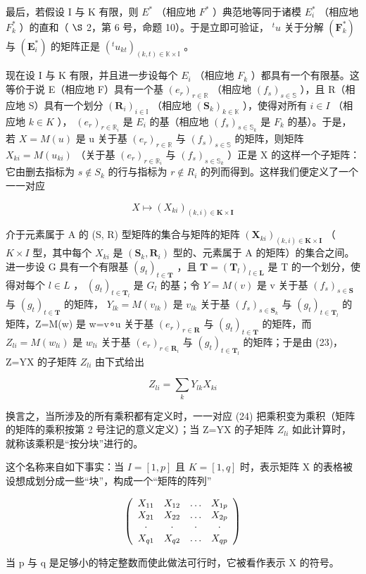 最后，若假设 I 与 K 有限，则 \(E^{*}\) （相应地 \(F^{*}\) ）典范地等同于诸模 \(E_{i}^{*}\) （相应地 \(F_{k}^{*}\) ）的直和（ \(\S\) 2，第 6 号，命题 10）。于是立即可验证， \(^{t}u\) 关于分解 \((\mathbf{F}_{k}^{*})\) 与 \((\mathbf{E}_{i}^{*})\) 的矩阵正是 \((^{t}u_{kt})_{(k,t)\in\mathbb{K}\times\mathbb{I}}\) 。

现在设 I 与 K 有限，并且进一步设每个 \(E_{i}\) （相应地 \(F_{k}\) ）都具有一个有限基。这等价于说 E（相应地 F）具有一个基 \((e_{r})_{r\in\mathbb{R}}\) （相应地 \((f_{s})_{s\in\mathbb{S}}\) ），且 R（相应地 S）具有一个划分 \((\mathbf{R}_{i})_{i\in\mathbb{I}}\) （相应地 \((\mathbf{S}_{k})_{k\in\mathbb{K}}\) ），使得对所有 \(i\in I\) （相应地 \(k\in K\) ）， \((e_{r})_{r\in\mathbb{R}_{i}}\) 是 \(E_{i}\) 的基（相应地 \((f_{s})_{s\in\mathbb{S}_{k}}\) 是 \(F_{k}\) 的基）。于是，若 \(X=M(u)\) 是 u 关于基 \((e_{r})_{r\in\mathbb{R}}\) 与 \((f_{s})_{s\in\mathbb{S}}\) 的矩阵，则矩阵 \(X_{ki}=M(u_{ki})\) （关于基 \((e_{r})_{r\in\mathbb{R}_{i}}\) 与 \((f_{s})_{s\in\mathbb{S}_{k}}\) ）正是 X 的这样一个子矩阵：它由删去指标为 \(s\notin S_{k}\) 的行与指标为 \(r\notin R_{i}\) 的列而得到。这样我们便定义了一个一一对应

\[
X \mapsto (X _ {k i}) _ {(k, i) \in \mathbf {K} \times \mathbf {I}}\tag{24}
\]

介于元素属于 A 的 (S, R) 型矩阵的集合与矩阵的矩阵 \((\mathbf{X}_{ki})_{(k,i)\in\mathbf{K}\times\mathbf{I}}\) （ \(K\times I\) 型，其中每个 \(X_{ki}\) 是 \((\mathbf{S}_{k},\mathbf{R}_{i})\) 型的、元素属于 A 的矩阵）的集合之间。进一步设 G 具有一个有限基 \((g_{t})_{t\in\mathbf{T}}\) ，且 \(\mathbf{T}=(\mathbf{T}_{l})_{l\in\mathbf{L}}\) 是 T 的一个划分，使得对每个 \(l\in L\) ， \((g_{t})_{t\in\mathbf{T}_{l}}\) 是 \(G_{l}\) 的基；令 \(Y=M(v)\) 是 v 关于基 \((f_{s})_{s\in\mathbf{S}}\) 与 \((g_{t})_{t\in\mathbf{T}}\) 的矩阵， \(Y_{lk}=M(v_{lk})\) 是 \(v_{lk}\) 关于基 \((f_{s})_{s\in\mathbf{S}_{k}}\) 与 \((g_{t})_{t\in\mathbf{T}_{l}}\) 的矩阵，Z=M(w) 是 w=v∘u 关于基 \((e_{r})_{r\in\mathbf{R}}\) 与 \((g_{t})_{t\in\mathbf{T}}\) 的矩阵，而 \(Z_{li}=M(w_{li})\) 是 \(w_{li}\) 关于基 \((e_{r})_{r\in\mathbf{R}_{i}}\) 与 \((g_{t})_{t\in\mathbf{T}_{l}}\) 的矩阵；于是由 (23)，Z=YX 的子矩阵 \(Z_{li}\) 由下式给出

\[
Z _ {l i} = \sum_ {k} Y _ {l k} X _ {k i}\tag{25}
\]

换言之，当所涉及的所有乘积都有定义时，一一对应 (24) 把乘积变为乘积（矩阵的矩阵的乘积按第 2 号注记的意义定义）；当 Z=YX 的子矩阵 \(Z_{li}\) 如此计算时，就称该乘积是“按分块”进行的。

这个名称来自如下事实：当 \(I = [1, p]\) 且 \(K = [1, q]\) 时，表示矩阵 X 的表格被设想成划分成一些“块”，构成一个“矩阵的阵列”

\[
\left( \begin{array}{c c c c} X _ {1 1} & X _ {1 2} & \ldots & X _ {1 p} \\ X _ {2 1} & X _ {2 2} & \ldots & X _ {2 p} \\ \cdot & \cdot & \cdot & \cdot \\ X _ {q 1} & X _ {q 2} & \ldots & X _ {q p} \end{array} \right)
\]

当 p 与 q 是足够小的特定整数而使此做法可行时，它被看作表示 X 的符号。


